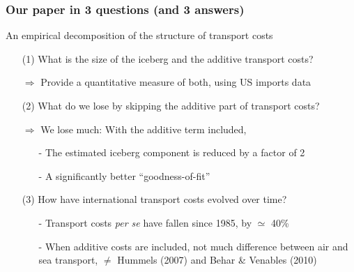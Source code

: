 \documentclass[10 pt,Helvetica, french]{beamer}
\begin{document}
\begin{frame}
\frametitle{Our paper in 3 questions (and 3 answers)}
An empirical decomposition of the structure of transport costs \vspace{0.1cm}
\begin{itemize}
\item[(1)] What is the size of the iceberg and the additive transport costs? \vspace{0.1cm}
\item[$\Rightarrow$] Provide a quantitative measure of both, using US imports data \vspace{0.1cm}
\item[(2)] What do we lose by skipping the additive part of transport costs? \vspace{0.1cm}
\item[$\Rightarrow$] We lose much: With the additive term included, \vspace{0.1cm}
\begin{itemize}
\item[-] The estimated iceberg component is reduced by a factor of 2 \vspace{0.1cm}
\item[-] A significantly better ``goodness-of-fit'' \vspace{0.1cm}
\end{itemize}
\item[(3)] How have international transport costs evolved over time? \vspace{0.1cm}
\begin{itemize}
\item[-] Transport costs \textit{per se} have fallen since 1985, by $\simeq$ 40\% \vspace{0.1cm}
\item[-] When additive costs are included, not much difference between air and sea transport, $\neq$ Hummels (2007) and Behar \& Venables (2010) \vspace{0.1cm}
\end{itemize}
\end{itemize}
\end{frame}
\end{document}
